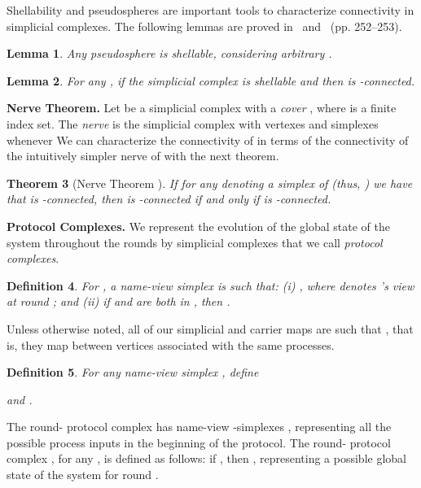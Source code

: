 \documentclass[11pt]{article}
\newtheorem{theorem}{Theorem}[section]
\newtheorem{definition}[theorem]{Definition}
\newtheorem{lemma}[theorem]{Lemma}
\begin{document}
Shellability and pseudospheres are important tools to
characterize connectivity in simplicial complexes.
The following lemmas are proved
in~\cite{ConcurrentShellable} and~\cite{MauriceBook} (pp. 252--253).

\begin{lemma}
\label{lemma-pseudosphere-shellable}
Any pseudosphere  is shellable,
considering arbitrary .
\end{lemma}


\begin{lemma}
\label{lemma-shellable-connected}
For any ,
if the simplicial complex  is shellable and 
then  is -connected.
\end{lemma}




\textbf{Nerve Theorem.} 
Let  be a simplicial complex with a \emph{cover}
,
where  is a finite index set.
The \emph{nerve}  is the simplicial complex with vertexes 
and simplexes  whenever 
We can characterize the connectivity of  in terms of the connectivity of
the intuitively simpler nerve of 
with the next theorem.

\begin{theorem}[Nerve Theorem \cite{Kozlov07,Bjorner1995}]
\label{theorem-nerve}
If for any  denoting a simplex of 
(thus, )
we have that  is -connected,
then  is -connected if and only if  is -connected.
\end{theorem}



\textbf{Protocol Complexes.} 
We represent the evolution of the global state of the system throughout the rounds
by simplicial complexes that we call \emph{protocol complexes}.


\begin{definition}
\label{definition-labeled}
For ,
a \emph{name-view} simplex  is such that:
(i) ,
where  denotes 's view at round ;
and (ii) if  and  are both in ,
then .
\end{definition}

Unless otherwise noted, all of our simplicial and carrier maps  are such that , that is, they map between vertices associated with the same processes.

\begin{definition}
For any name-view simplex , define

and
.
\end{definition}

The round- protocol complex  has
name-view -simplexes ,
representing all the possible process inputs in the beginning of the protocol.
The round- protocol complex ,
for any ,
is defined as follows:
if ,
then ,
representing a possible global state of the system for round .
\end{document}
